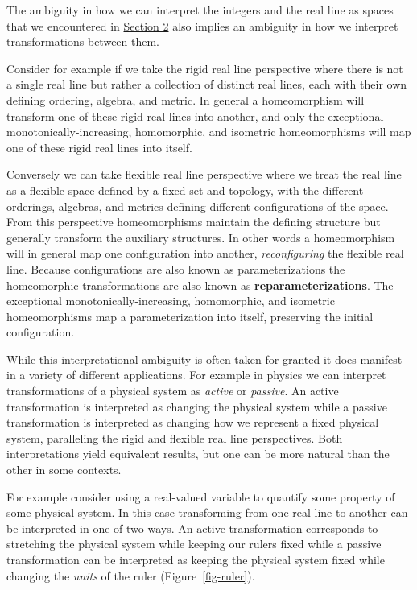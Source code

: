 \documentclass[
  letterpaper,
  DIV=11,
  numbers=noendperiod]{scrartcl}
\begin{document}
The ambiguity in how we can interpret the integers and the real line as
spaces that we encountered in
\protect\hyperlink{sec:proto-spaces}{Section 2} also implies an
ambiguity in how we interpret transformations between them.

Consider for example if we take the rigid real line perspective where
there is not a single real line but rather a collection of distinct real
lines, each with their own defining ordering, algebra, and metric. In
general a homeomorphism will transform one of these rigid real lines
into another, and only the exceptional monotonically-increasing,
homomorphic, and isometric homeomorphisms will map one of these rigid
real lines into itself.

Conversely we can take flexible real line perspective where we treat the
real line as a flexible space defined by a fixed set and topology, with
the different orderings, algebras, and metrics defining different
configurations of the space. From this perspective homeomorphisms
maintain the defining structure but generally transform the auxiliary
structures. In other words a homeomorphism will in general map one
configuration into another, \emph{reconfiguring} the flexible real line.
Because configurations are also known as parameterizations the
homeomorphic transformations are also known as
\textbf{reparameterizations}. The exceptional monotonically-increasing,
homomorphic, and isometric homeomorphisms map a parameterization into
itself, preserving the initial configuration.

While this interpretational ambiguity is often taken for granted it does
manifest in a variety of different applications. For example in physics
we can interpret transformations of a physical system as \emph{active}
or \emph{passive}. An active transformation is interpreted as changing
the physical system while a passive transformation is interpreted as
changing how we represent a fixed physical system, paralleling the rigid
and flexible real line perspectives. Both interpretations yield
equivalent results, but one can be more natural than the other in some
contexts.

For example consider using a real-valued variable to quantify some
property of some physical system. In this case transforming from one
real line to another can be interpreted in one of two ways. An active
transformation corresponds to stretching the physical system while
keeping our rulers fixed while a passive transformation can be
interpreted as keeping the physical system fixed while changing the
\emph{units} of the ruler (Figure~\ref{fig-ruler}).
\end{document}
